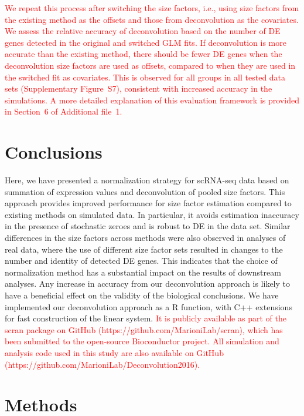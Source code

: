 \documentclass{bmcart}
\newcommand{\supprealassess}{6}
\newcommand{\suppdeassess}{S7}
\newcommand{\revised}[1]{\textcolor{red}{#1}}
\begin{document}
\revised{We repeat this process after switching the size factors, i.e., using size factors from the existing method as the offsets and those from deconvolution as the covariates. 
We assess the relative accuracy of deconvolution based on the number of DE genes detected in the original and switched GLM fits.
If deconvolution is more accurate than the existing method, there should be fewer DE genes when the deconvolution size factors are used as offsets, compared to when they are used in the switched fit as covariates.
This is observed for all groups in all tested data sets (Supplementary Figure~\suppdeassess{}), consistent with increased accuracy in the simulations.
A more detailed explanation of this evaluation framework is provided in Section~\supprealassess{} of Additional file~1.
}

\section*{Conclusions}
Here, we have presented a normalization strategy for scRNA-seq data based on summation of expression values and deconvolution of pooled size factors.
This approach provides improved performance for size factor estimation compared to existing methods on simulated data.
In particular, it avoids estimation inaccuracy in the presence of stochastic zeroes and is robust to DE in the data set.
Similar differences in the size factors across methods were also observed in analyses of real data,
    where the use of different size factor sets resulted in changes to the number and identity of detected DE genes.
This indicates that the choice of normalization method has a substantial impact on the results of downstream analyses.
Any increase in accuracy from our deconvolution approach is likely to have a beneficial effect on the validity of the biological conclusions.
We have implemented our deconvolution approach as a R function, with C++ extensions for fast construction of the linear system.
\revised{It is publicly available as part of the scran package on GitHub ({https://github.com/MarioniLab/scran}), which has been submitted to the open-source Bioconductor project.
All simulation and analysis code used in this study are also available on GitHub ({https://github.com/MarioniLab/Deconvolution2016}).}

\section*{Methods}
\end{document}
